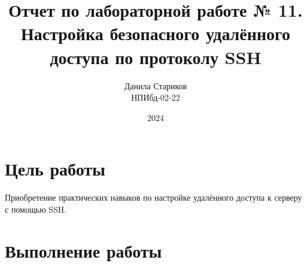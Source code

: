 

\title{Отчет по лабораторной работе № 11. \\ Настройка безопасного удалённого доступа по протоколу SSH}
\author{Данила Стариков \\ НПИбд-02-22}
\date{2024}



\maketitle
\newpage

\tableofcontents

\newpage
\section{Цель работы}
Приобретение практических навыков по настройке удалённого доступа к серверу с помощью SSH.

\newpage
\section{Выполнение работы}
